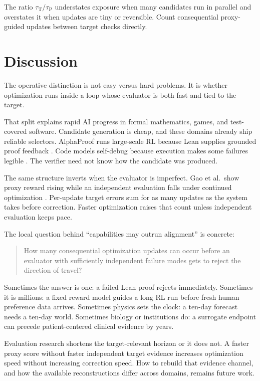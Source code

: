 \documentclass[11pt]{article}
\newcommand{\tauP}{\tau_{\mathrm{P}}}
\newcommand{\tauT}{\tau_{\mathrm{T}}}
\begin{document}
The ratio \(\tauT/\tauP\) understates exposure when many candidates run in parallel and overstates it when updates are tiny or reversible. Count consequential proxy-guided updates between target checks directly.

\section{Discussion}

The operative distinction is not easy versus hard problems. It is whether optimization runs inside a loop whose evaluator is both fast and tied to the target.

That split explains rapid AI progress in formal mathematics, games, and test-covered software. Candidate generation is cheap, and these domains already ship reliable selectors. AlphaProof runs large-scale RL because Lean supplies grounded proof feedback \parencite{hubert2025alphaproof}. Code models self-debug because execution makes some failures legible \parencite{chen2023selfdebug}. The verifier need not know how the candidate was produced.

The same structure inverts when the evaluator is imperfect. Gao et al.\ show proxy reward rising while an independent evaluation falls under continued optimization \parencite{gao2022overoptimization}. Per-update target errors sum for as many updates as the system takes before correction. Faster optimization raises that count unless independent evaluation keeps pace.

The local question behind ``capabilities may outrun alignment'' is concrete:
\begin{quote}
How many consequential optimization updates can occur before an evaluator with sufficiently independent failure modes gets to reject the direction of travel?
\end{quote}

Sometimes the answer is one: a failed Lean proof rejects immediately. Sometimes it is millions: a fixed reward model guides a long RL run before fresh human preference data arrives. Sometimes physics sets the clock: a ten-day forecast needs a ten-day world. Sometimes biology or institutions do: a surrogate endpoint can precede patient-centered clinical evidence by years.

Evaluation research shortens the target-relevant horizon or it does not. A faster proxy score without faster independent target evidence increases optimization speed without increasing correction speed. How to rebuild that evidence channel, and how the available reconstructions differ across domains, remains future work.
\end{document}
